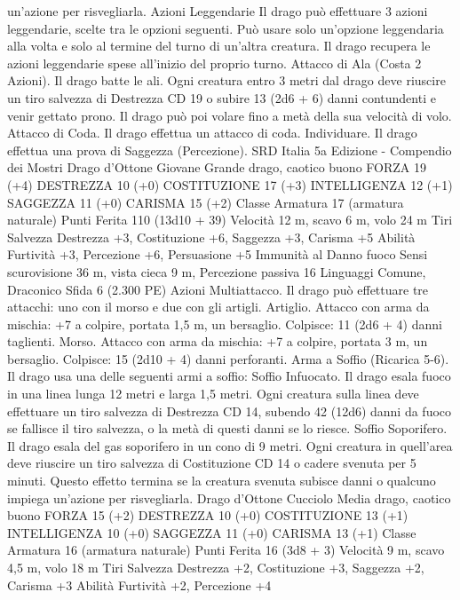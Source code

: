 \begin{multicols}{2}
un’azione per risvegliarla.
Azioni Leggendarie
Il drago può effettuare 3 azioni leggendarie, scelte tra le opzioni
seguenti. Può usare solo un’opzione leggendaria alla volta e solo
al termine del turno di un’altra creatura. Il drago recupera le
azioni leggendarie spese all’inizio del proprio turno.
Attacco di Ala (Costa 2 Azioni). Il drago batte le ali. Ogni
creatura entro 3 metri dal drago deve riuscire un tiro salvezza di
Destrezza CD 19 o subire 13 (2d6 + 6) danni contundenti e venir
gettato prono. Il drago può poi volare fino a metà della sua
velocità di volo.
Attacco di Coda. Il drago effettua un attacco di coda.
Individuare. Il drago effettua una prova di Saggezza
(Percezione).
SRD Italia 5a Edizione - Compendio dei Mostri
Drago d’Ottone Giovane
Grande drago, caotico buono
FORZA 19 (+4)
DESTREZZA 10 (+0)
COSTITUZIONE 17 (+3)
INTELLIGENZA 12 (+1)
SAGGEZZA 11 (+0)
CARISMA 15 (+2)
Classe Armatura 17 (armatura naturale)
Punti Ferita 110 (13d10 + 39)
Velocità 12 m, scavo 6 m, volo 24 m
Tiri Salvezza Destrezza +3, Costituzione +6, Saggezza +3,
Carisma +5
Abilità Furtività +3, Percezione +6, Persuasione +5
Immunità al Danno fuoco
Sensi scurovisione 36 m, vista cieca 9 m, Percezione passiva 16
Linguaggi Comune, Draconico
Sfida 6 (2.300 PE)
Azioni
Multiattacco. Il drago può effettuare tre attacchi: uno con il
morso e due con gli artigli.
Artiglio. Attacco con arma da mischia: +7 a colpire, portata 1,5
m, un bersaglio.
Colpisce: 11 (2d6 + 4) danni taglienti.
Morso. Attacco con arma da mischia: +7 a colpire, portata 3 m,
un bersaglio.
Colpisce: 15 (2d10 + 4) danni perforanti.
Arma a Soffio (Ricarica 5-6). Il drago usa una delle seguenti armi
a soffio:
Soffio Infuocato. Il drago esala fuoco in una linea lunga 12 metri e
larga 1,5 metri. Ogni creatura sulla linea deve effettuare un tiro
salvezza di Destrezza CD 14, subendo 42 (12d6) danni da fuoco se
fallisce il tiro salvezza, o la metà di questi danni se lo riesce.
Soffio Soporifero. Il drago esala del gas soporifero in un cono di 9
metri. Ogni creatura in quell’area deve riuscire un tiro salvezza di
Costituzione CD 14 o cadere svenuta per 5 minuti. Questo effetto
termina se la creatura svenuta subisce danni o qualcuno impiega
un’azione per risvegliarla.
Drago d’Ottone Cucciolo
Media drago, caotico buono
FORZA 15 (+2)
DESTREZZA 10 (+0)
COSTITUZIONE 13 (+1)
INTELLIGENZA 10 (+0)
SAGGEZZA 11 (+0)
CARISMA 13 (+1)
Classe Armatura 16 (armatura naturale)
Punti Ferita 16 (3d8 + 3)
Velocità 9 m, scavo 4,5 m, volo 18 m
Tiri Salvezza Destrezza +2, Costituzione +3, Saggezza +2,
Carisma +3
Abilità Furtività +2, Percezione +4

\end{multicols}
